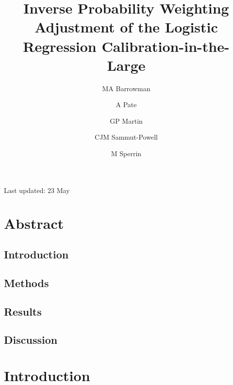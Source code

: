 \documentclass[
]{article}
\title{Inverse Probability Weighting Adjustment of the Logistic Regression Calibration-in-the-Large}
\author{MA Barrowman \and A Pate \and GP Martin \and CJM Sammut-Powell \and M Sperrin}
\date{}
\begin{document}
\maketitle

{
\setcounter{tocdepth}{2}
\tableofcontents
}
Last updated: 23 May

\hypertarget{abstract}{%
\section*{Abstract}\label{abstract}}

\hypertarget{introduction}{%
\subsection*{Introduction}\label{introduction}}

\hypertarget{methods}{%
\subsection*{Methods}\label{methods}}

\hypertarget{results}{%
\subsection*{Results}\label{results}}

\hypertarget{discussion}{%
\subsection*{Discussion}\label{discussion}}

\hypertarget{introduction-1}{%
\section{Introduction}\label{introduction-1}}
\end{document}
